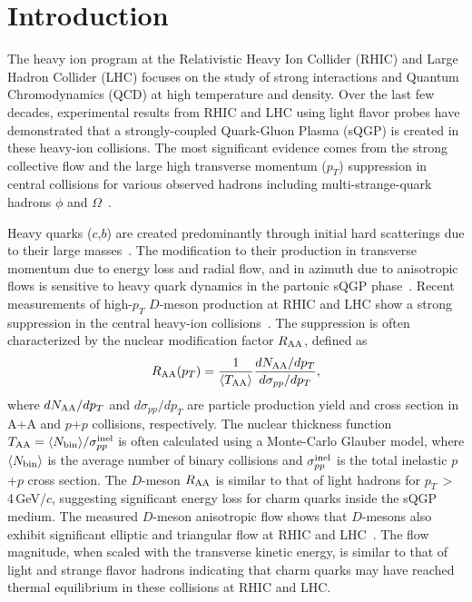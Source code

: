 \documentclass[%
 reprint,	
showpacs,
 amsmath,amssymb,
 aps,
 prc,
]{revtex4-1}
\begin{document}
\section{Introduction}
\label{introduction}

The heavy ion program at the Relativistic Heavy Ion Collider (RHIC) and Large Hadron Collider (LHC) focuses on the study of strong interactions and Quantum Chromodynamics (QCD) at high temperature and density. Over the last few decades, experimental results from RHIC and LHC using light flavor probes have demonstrated that a strongly-coupled Quark-Gluon Plasma (sQGP) is created in these heavy-ion collisions. The most significant evidence comes from the strong collective flow and the large high transverse momentum ($p_{T}$) suppression in central collisions for various observed hadrons including multi-strange-quark hadrons $\phi$ and $\Omega$~\cite{StarWhitePaper,PhenixWhitePaper,LhcSummary,Adamczyk:2015ukd,Abelev:2014pua}.

Heavy quarks ($c$,$b$) are created predominantly through initial hard scatterings due to their large masses~\cite{Ziwei_Lin,Cacciari}. The modification to their production in transverse momentum due to energy loss and radial flow, and in azimuth due to anisotropic flows is sensitive to heavy quark dynamics in the partonic sQGP phase~\cite{Moore}. Recent measurements of high-$p_{T}$ $D$-meson production at RHIC and LHC show a strong suppression in the central heavy-ion collisions~\cite{Alice_D_RAA_1,Alice_D_RAA_2,CMS_D_RAA_5TeV,Star_D_RAA}. The suppression is often characterized by the nuclear modification factor $R_{\rm AA}$, defined as
\begin{equation}
  R_{\rm AA}(p_T) = \frac{1}{\langle T_{\rm AA}\rangle} \frac{dN_{\rm AA}/dp_{T}}{d\sigma_{pp}/dp_{T}},
\label{equ:equation0}
\end{equation}
where $dN_{\rm AA}/dp_T$ and $d\sigma_{pp}/dp_T$ are particle production yield and cross section in A+A and $p$+$p$ collisions, respectively. The nuclear thickness function $T_{\rm AA}=\langle N_{\rm bin}\rangle/\sigma_{pp}^{\rm inel}$ is often calculated using a Monte-Carlo Glauber model, where $\langle N_{\rm bin}\rangle$ is the average number of binary collisions and $\sigma_{pp}^{\rm inel}$ is the total inelastic $p$+$p$ cross section.
The $D$-meson $R_{\rm AA}$ is similar to that of light hadrons for $p_{T}$$\,>$\,4\,GeV/$c$, suggesting significant energy loss for charm quarks inside the sQGP medium. The measured $D$-meson anisotropic flow shows that $D$-mesons also exhibit significant elliptic and triangular flow at RHIC and LHC~\cite{Alice_D_v2_276TeV_PRL,Alice_D_v2_276TeV_PRC,CMS_D_vn_5TeV,Star_D_v2}. The flow magnitude, when scaled with the transverse kinetic energy, is similar to that of light and strange flavor hadrons indicating that charm quarks may have reached thermal equilibrium in these collisions at RHIC and LHC.
\end{document}
